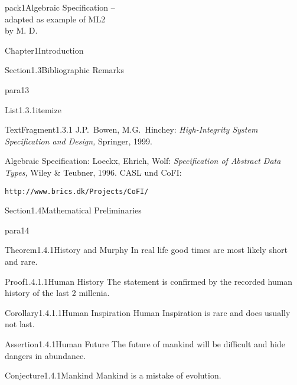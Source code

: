 \documentclass[landscape, slides, light]{mmiss2}
\begin{document}
\begin{Package}{pack1}{Algebraic
Specification -- \\ adapted as example of ML2\\ by M. D.}
\begin{Section}{Chapter1}{Introduction}
\begin{Section}{Section1.3}{Bibliographic Remarks}{}
\begin{Paragraph}{para13}{}{}
\begin{List}{List1.3.1}{itemize}{}
\begin{TextFragment}{TextFragment1.3.1}{}
J.P.~Bowen, M.G.~Hinchey: {\it High-Integrity System Specification and Design,}
Springer, 1999.
\end{TextFragment}

\ListItem{}
Algebraic Specification: Loeckx, Ehrich, Wolf: {\it
Specification of Abstract Data Types,} Wiley \& Teubner, 1996.
\ListItem{}
CASL und CoFI: 
\begin{verbatim}
http://www.brics.dk/Projects/CoFI/
\end{verbatim}
\end{List}
\end{Paragraph}

\end{Section}

\begin{Section}{Section1.4}{Mathematical Preliminaries}{}
\begin{Paragraph}{para14}{}{}
\begin{Theorem}[Desperation]{Theorem1.4.1}{History and Murphy}{}
In real life good times are most likely short and rare.
\end{Theorem}

\begin{Proof}{Proof1.4.1.1}{Human
History}{}
The statement is confirmed by the recorded human history of the last 2
millenia.
\end{Proof}

\begin{Corollary}{Corollary1.4.1.1}{Human
Inspiration}{}
Human Inspiration is rare and does usually not last.
\end{Corollary}

\begin{Assertion}{Assertion1.4.1}{Human
Future}{}
The future of mankind will be difficult and hide dangers in abundance. 
\end{Assertion}

\begin{Conjecture}[Hypothesis]{Conjecture1.4.1}{Mankind}{}
Mankind is a mistake of evolution.
\end{Conjecture}
\end{Paragraph}
\end{Section}

\end{Section}

\end{Package}
\end{document}
